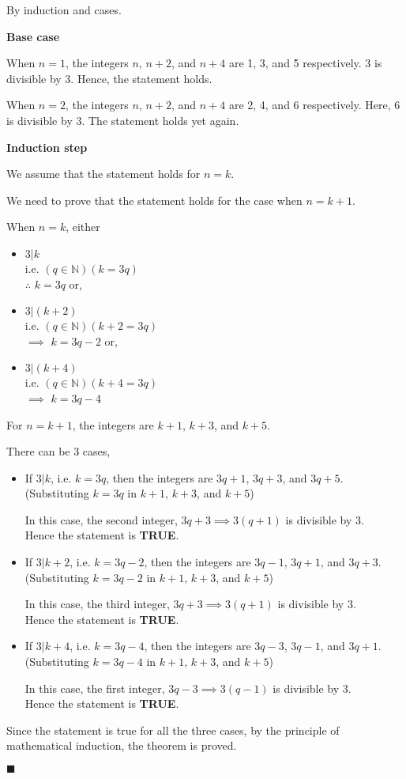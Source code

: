 \documentclass[12pt]{article}
\newcommand{\N}{\mathbb{N}}
\renewcommand{\qed}{\hfill$\blacksquare$}
\renewenvironment{proof}{\begin{addmargin}[1em]{0em}\begin{newproof}}{\end{newproof}\end{addmargin}\qed}
\begin{document}
\begin{proof}
By induction and cases.

\hfill \break
\textbf{Base case}

When $n=1$, the integers $n$, $n+2$, and $n+4$ are 1, 3, and 5 respectively. 3 is divisible by 3. Hence, the statement holds.

When $n=2$, the integers $n$, $n+2$, and $n+4$ are 2, 4, and 6 respectively. Here, 6 is divisible by 3. The statement holds yet again.

\hfill \break
\textbf{Induction step}

We assume that the statement holds for $n=k$.

We need to prove that the statement holds for the case when $n=k+1$.

\hfill \break
When $n=k$, either
\begin{itemize}
    \item $3 | k$ \\
    i.e. $(q \in \N)(k = 3q)$ \\
    $\therefore$ $k = 3q$ \quad or,
    \item $3 | (k+2)$ \\
    i.e. $(q \in \N)(k + 2 = 3q)$ \\
    $\implies$ $k = 3q - 2$ \quad or,
    \item $3 | (k+4)$ \\
    i.e. $(q \in \N)(k + 4 = 3q)$ \\
    $\implies$ $k = 3q - 4$
\end{itemize}

\hfill \break
For $n=k+1$, the integers are $k+1$, $k+3$, and $k+5$.

There can be 3 cases,
\begin{itemize}
    \item If $3|k$, i.e. $k=3q$, then the integers are $3q+1$, $3q+3$, and $3q+5$. (Substituting $k=3q$ in $k+1$, $k+3$, and $k+5$)
    
    In this case, the second integer, $3q+3 \implies 3(q+1)$ is divisible by 3. \\
    Hence the statement is \textbf{TRUE}.
    \item If $3|k+2$, i.e. $k=3q-2$, then the integers are $3q-1$, $3q+1$, and $3q+3$. (Substituting $k=3q-2$ in $k+1$, $k+3$, and $k+5$)
    
    In this case, the third integer, $3q+3 \implies 3(q+1)$ is divisible by 3. \\
    Hence the statement is \textbf{TRUE}.
    \item If $3|k+4$, i.e. $k=3q-4$, then the integers are $3q-3$, $3q-1$, and $3q+1$. (Substituting $k=3q-4$ in $k+1$, $k+3$, and $k+5$)
    
    In this case, the first integer, $3q-3 \implies 3(q-1)$ is divisible by 3. \\
    Hence the statement is \textbf{TRUE}.
\end{itemize}

\hfill \break
Since the statement is true for all the three cases, by the principle of mathematical induction, the theorem is proved.
\end{proof}
\end{document}
